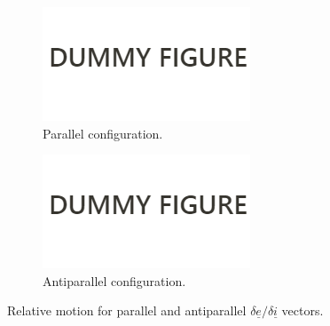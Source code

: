 			\begin{figure}[ht]
			\centering
			\medskip
			\begin{subfigure}[t]{.32\linewidth}
			\centering\includegraphics[width=\linewidth]{Figures/Dummy_figure}
			\caption{Parallel configuration.}
			\label{figCh2:Antiparallel}
			\end{subfigure}
			\begin{subfigure}[t]{.32\linewidth}
			\centering\includegraphics[width=\linewidth]{Figures/Dummy_figure}
			\caption{Antiparallel configuration.}
			\label{figCh2:Antiparallel}
			\end{subfigure}
			\caption{Relative motion for parallel and antiparallel $\delta \underline{e}/\delta\underline{i}$ vectors.}
			\label{fig:E_I_par_anti}
			\end{figure}
			\FloatBarrier

